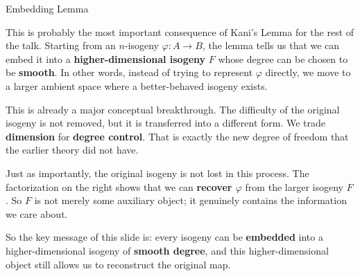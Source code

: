 \documentclass[aspectratio=169,notheorems]{beamer}
\begin{document}
\begin{frame}{Embedding Lemma}
{			This is probably the most important consequence of Kani's Lemma for the rest of the talk. Starting from an \(n\)-isogeny \(\varphi : A \to B\), the lemma tells us that we can embed it into a \textbf{higher-dimensional isogeny} \(F\) whose degree can be chosen to be \textbf{smooth}. In other words, instead of trying to represent \(\varphi\) directly, we move to a larger ambient space where a better-behaved isogeny exists.
			
			This is already a major conceptual breakthrough. The difficulty of the original isogeny is not removed, but it is transferred into a different form. We trade \textbf{dimension} for \textbf{degree control}. That is exactly the new degree of freedom that the earlier theory did not have.
			
			Just as importantly, the original isogeny is not lost in this process. The factorization on the right shows that we can \textbf{recover \(\varphi\)} from the larger isogeny \(F\). So \(F\) is not merely some auxiliary object; it genuinely contains the information we care about.
			
			So the key message of this slide is: every isogeny can be \textbf{embedded} into a higher-dimensional isogeny of \textbf{smooth degree}, and this higher-dimensional object still allows us to reconstruct the original map.
		}
	\end{frame}
	
\end{document}
